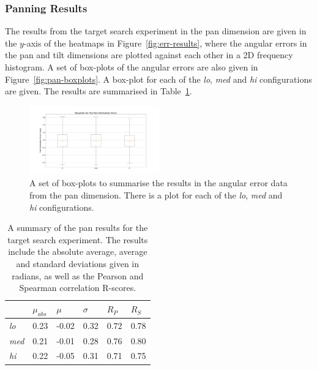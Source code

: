 \documentclass[format=sigconf, review=true, screen=true, anonymous=true]{acmart}
\begin{document}
\subsubsection{Panning Results}

The results from the target search experiment in the pan dimension are given in the $y$-axis of the heatmaps in Figure~\ref{fig:err-results}, where the angular errors in the pan and tilt dimensions are plotted against each other in a 2D frequency histogram. A set of box-plots of the angular errors are also given in Figure~\ref{fig:pan-boxplots}. A box-plot for each of the \emph{lo}, \emph{med} and \emph{hi} configurations are given. The results are summarised in Table~\ref{tab:pan-results}.


\begin{figure}
  \centering
  \includegraphics[width=0.5\textwidth]{figures/pan_err_boxplot.png}
  \caption{A set of box-plots to summarise the results in the angular error data from the pan dimension. There is a plot for each of the \emph{lo}, \emph{med} and \emph{hi} configurations. }
  \label{fig:pan-err-boxplots}
\end{figure}

\begin{table}
  \centering
  \caption{A summary of the pan results for the target search experiment. The results include the absolute average, average and standard deviations given in radians, as well as the Pearson and Spearman correlation R-scores.}
  \label{tab:pan-results}
  \begin{tabular}{|l|l|l|l|l|l|}
    \hline
    & $\mu_{abs}$ & $\mu$ & $\sigma$ & $R_{P}$ & $R_{S}$ \\\hline\hline
    \emph{lo}  & 0.23 & -0.02 & 0.32 & 0.72 & 0.78 \\\hline
    \emph{med} & 0.21 & -0.01 & 0.28 & 0.76 & 0.80 \\\hline
    \emph{hi}  & 0.22 & -0.05 & 0.31 & 0.71 & 0.75 \\\hline
  \end{tabular}
\end{table}
\end{document}
